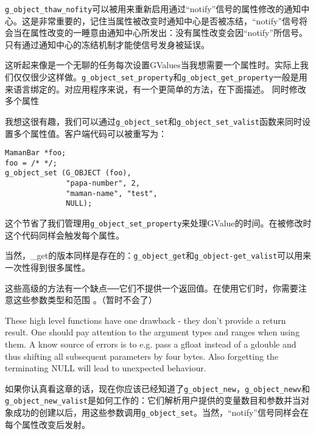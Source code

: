 \verb|g_object_thaw_nofity|可以被用来重新启用通过“notify”信号的属性修改的通知中心。这是非常重要的，记住当属性被改变时通知中心是否被冻结，“notify”信号将会当在属性改变的一睡意由通知中心所发出：没有属性改变会因“notify”所信号。只有通过通知中心的冻结机制才能使信号发身被延误。

这听起来像是一个无聊的任务每次设置GValues当我想需要一个属性时。实际上我们仅仅很少这样做。\verb|g_object_set_property|和\verb|g_object_get_property|一般是用来语言绑定的。对应用程序来说，有一个更简单的方法，在下面描述。
同时修改多个属性

我想这很有趣，我们可以通过\verb|g_object_set|和\verb|g_object_set_valist|函数来同时设置多个属性值。客户端代码可以被重写为：

\begin{verbatim}
MamanBar *foo;
foo = /* */;
g_object_set (G_OBJECT (foo),
              "papa-number", 2,
              "maman-name", "test",
              NULL);
\end{verbatim}
这个节省了我们管理用\verb|g_object_set_property|来处理GValue的时间。在被修改时这个代码同样会触发每个属性。

当然，\_get的版本同样是存在的：\verb|g_object_get|和\verb|g_object-get_valist|可以用来一次性得到很多属性。

这些高级的方法有一个缺点──它们不提供一个返回值。在使用它们时，你需要注意这些参数类型和范围 。（暂时不会了）

These high level functions have one drawback - they don’t provide a return result. One should pay attention to the argument types and ranges when using them. A know source of errors is to e.g. pass a gfloat instead of a gdouble and thus shifting all subsequent parameters by four bytes. Also forgetting the terminating NULL will lead to unexpected behaviour.

如果你认真看这章的话，现在你应该已经知道了\verb|g_object_new|，\verb|g_object_newv|和\verb|g_object_new_valist|是如何工作的：它们解析用户提供的变量数目和参数并当对象成功的创建以后，用这些参数调用\verb|g_object_set|。当然，“notify”信号同样会在每个属性改变后发射。
